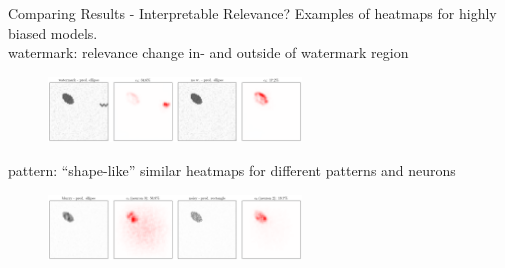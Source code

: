 \documentclass[German, aspectratio=169]{beamer}
\begin{document}
\begin{frame}[t,noframenumbering]{Comparing Results - Interpretable Relevance?}
    Examples of heatmaps for highly biased models.\\
    watermark: relevance change in- and outside of watermark region
    \begin{figure}[t!]
        \includegraphics[width=0.6\textwidth]{images/example_relchange_outside_wm.png}
    \end{figure}
    pattern: ``shape-like'' similar heatmaps for different patterns and neurons
    \begin{figure}[t!]
        \includegraphics[width=0.6\textwidth]{images/example_top_neuron_broken.png}
    \end{figure}
\end{frame}
\end{document}
